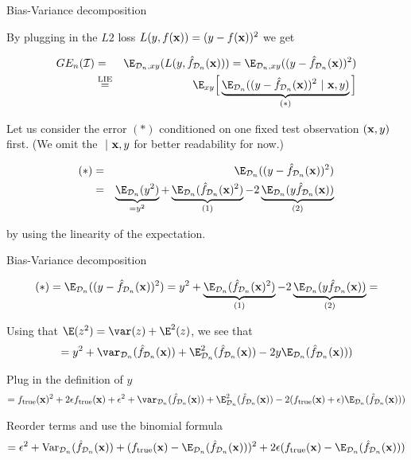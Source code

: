 \documentclass[11pt,compress,t,notes=noshow, xcolor=table]{beamer}
\begin{document}
\begin{frame}{Bias-Variance decomposition}

By plugging in the $L2$ loss $L(y, f(\mathbf{x})) = (y - f(\mathbf{x}))^2$ we get

{\footnotesize
\begin{eqnarray*}
GE_n(\ind) &=& \E_{\D_n, xy}( L(y, \fh_{\D_n}(\xv))) = \E_{\D_n, xy}((y - \fh_{\D_n}(\xv))^2) \\
&\stackrel{\text{LIE}}{=}& \E_{xy}\Big[\underbrace{\E_{\D_n}((y - \fh_{\D_n}(\xv))^2~|~ \xv, y)}_{(*)}\Big] 
\end{eqnarray*}
}

Let us consider the error $(*)$ conditioned on one fixed test observation $(\mathbf{x}, y)$ first. (We omit the $~|~\mathbf{x}, y$ for better readability for now.)

{\footnotesize
\begin{eqnarray*}
(*) &=& \E_{\D_n}((y - \fh_{\D_n}(\xv))^2)\\
&=& \underbrace{\E_{\D_n}(y^2)}_{= y^2} + \underbrace{\E_{\D_n}(\fh_{\D_n}(\xv)^2)}_{(1)}  - 2\underbrace{\E_{\D_n}(y\fh_{\D_n}(\xv))}_{(2)} 
\end{eqnarray*}
}

by using the linearity of the expectation.  %

\end{frame}

\begin{frame2}[footnotesize]{Bias-Variance decomposition}

$$
(*) = \E_{\D_n}((y - \fh_{\D_n}(\xv))^2) = 
y^2 + \underbrace{\E_{\D_n}(\fh_{\D_n}(\xv)^2)}_{(1)}  - 2\underbrace{\E_{\D_n}(y\fh_{\D_n}(\xv))}_{(2)} =
$$

\vfill

Using that $\E(z^2) =\var(z) + \E^2(z)$, we see that
$$
= y^2 + \var_{\D_n}(\fh_{\D_n}(\xv)) + \E^2_{\D_n}(\fh_{\D_n}(\xv)) - 2y \E_{\D_n}(\fh_{\D_n}(\xv))) 
$$

\vfill

Plug in the definition of $y$
$$
 = \ftrue(\xv)^2 +2\epsilon\ftrue(\xv) + \epsilon^2 + \var_{\D_n}(\fh_{\D_n}(\xv)) + \E^2_{\D_n}(\fh_{\D_n}(\xv)) - 2 (\ftrue(\xv)+\epsilon)\E_{\D_n}(\fh_{\D_n}(\xv))) 
$$

\vfill

Reorder terms and use the binomial formula
$$
= \epsilon^2 + \text{Var}_{\D_n}(\fh_{\D_n}(\xv)) + 
  (\ftrue(\xv) - \E_{\D_n}(\fh_{\D_n}(\xv)))^2
 +2 \epsilon (\ftrue(\xv) - \E_{\D_n}(\fh_{\D_n}(\xv)))
$$

\end{frame2}
\end{document}
